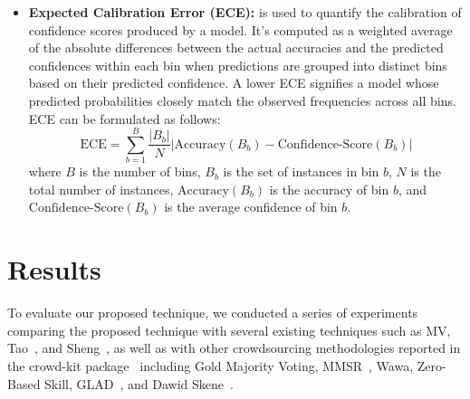 \begin{itemize}
%
\item \textbf{Expected Calibration Error (ECE):}  is used to quantify the calibration of  confidence scores produced by a model. It's computed as a weighted average of the absolute differences between the actual accuracies and the predicted confidences within each bin when predictions are grouped into distinct bins based on their predicted confidence. A lower ECE signifies a model whose predicted probabilities closely match the observed frequencies across all bins. ECE can be formulated as follows:
\begin{equation}
\text{ECE} = \sum_{b=1}^{B} \frac{ \vert B_b \vert }{N} \left\vert {\text{Accuracy} ( B_{b} ) - \text{Confidence-Score}(B_b)} \right\vert
\end{equation}
where $B$ is the number of bins, $B_b$ is the set of instances in bin $b$, $N$ is the total number of instances, $\text{Accuracy} (B_b)$ is the accuracy of bin $b$, and $\text{Confidence-Score} (B_b)$ is the average confidence of bin $b$.
\end{itemize}

\section{Results}\label{sec:crowd.results}
To evaluate our proposed technique, we conducted a series of experiments comparing the proposed technique with several existing techniques such as MV, Tao~\cite{tao_Label_2020}, and Sheng~\cite{sheng_Majority_2019}, as well as with other crowdsourcing methodologies reported in the crowd-kit package~\cite{ustalov_learning_2021} including Gold Majority Voting, MMSR~\cite{ma_Adversarial_2020}, Wawa, Zero-Based Skill, GLAD~\cite{whitehill_Whose_2009}, and Dawid Skene~\cite{dawid_Maximum_1979}.

